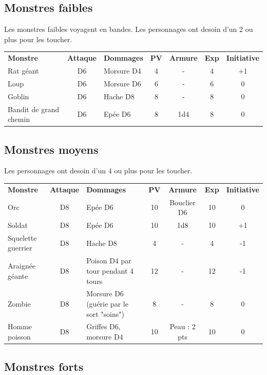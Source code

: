 \documentclass[a4paper, 11pt, twoside]{article}
\begin{document}
\subsection{Monstres faibles}
\label{sec:org7216930}

Les monstres faibles voyagent en bandes. Les personnages ont desoin d'un 2 ou plus pour les toucher.

\begin{longtable}{p{4cm}cp{5cm}cccc}
\textbf{Monstre} & \textbf{Attaque} & \textbf{Dommages} & \textbf{PV} & \textbf{Armure} & \textbf{Exp} & \textbf{Initiative}\\
Rat géant & D6 & Morsure D4 & 4 & - & 4 & +1\\
Loup & D6 & Morsure D6 & 6 & - & 6 & 0\\
Goblin & D6 & Hache D8 & 8 & - & 8 & 0\\
Bandit de grand chemin & D6 & Epée D6 & 8 & 1d4 & 8 & 0\\
\end{longtable}

\subsection{Monstres moyens}
\label{sec:org1075bfe}

Les personnages ont desoin d'un 4 ou plus pour les toucher.

\begin{longtable}{lclcccc}
\textbf{Monstre} & \textbf{Attaque} & \textbf{Dommages} & \textbf{PV} & \textbf{Armure} & \textbf{Exp} & \textbf{Initiative}\\
Orc & D8 & Epée D6 & 10 & Bouclier D6 & 10 & 0\\
Soldat & D8 & Epée D6 & 10 & 1d8 & 10 & +1\\
Squelette guerrier & D8 & Hache D8 & 4 & - & 4 & -1\\
Araignée géante & D8 & Poison D4 par tour pendant 4 tours & 12 & - & 12 & -1\\
Zombie & D8 & Morsure D6 (guérie par le sort "soins") & 8 & - & 8 & 0\\
Homme poisson & D8 & Griffes D6, morsure D4 & 10 & Peau : 2 pts & 10 & 0\\
\end{longtable}

\subsection{Monstres forts}
\label{sec:orga0b3c97}
\end{document}
